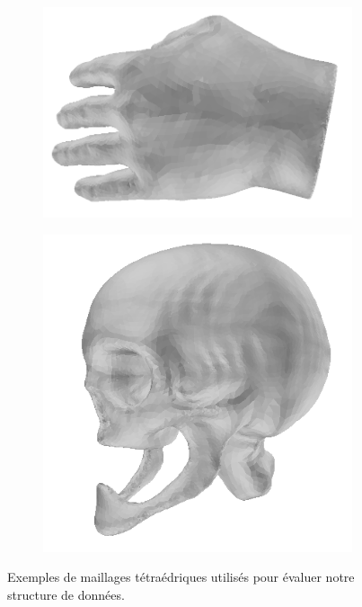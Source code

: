 \begin{figure}[th]
\begin{subfigure}{.24\textwidth}
  \centering
  \includegraphics[scale=0.12]{../Images/hand}
\end{subfigure}%
\begin{subfigure}{.24\textwidth}
  \centering
  \includegraphics[scale=0.14]{../Images/skull}
\end{subfigure}
\caption{Exemples de maillages tétraédriques utilisés pour évaluer notre structure de données.}
\label{fig:exemples_maillages}
\end{figure}

